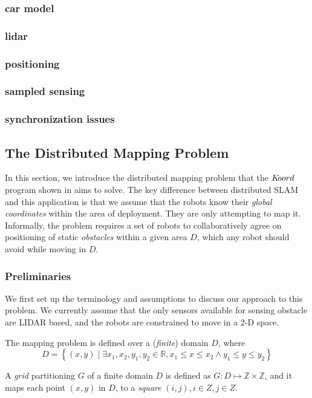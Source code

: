 \subsubsection{car model}
\subsubsection{lidar}
\subsubsection{positioning}
\subsubsection{sampled sensing}
\subsubsection{synchronization issues}
 
\subsection{The Distributed Mapping Problem}
In this section, we introduce the distributed mapping problem that the $K\kern-2pt oord$ program shown in  aims to solve. The key difference between distributed SLAM and this application is that we assume that the robots know their \emph{global coordinates} within the area of deployment. They are only attempting to map it. 
Informally, the problem requires a set of robots to collaboratively agree on positioning of static \emph{obstacles} within a given area $D$, which any robot should avoid while moving in $D$.

\subsubsection{Preliminaries}
We first set up the terminology and assumptions to discuss our approach to this problem. We currently assume that the only sensors available for sensing obstacle are LIDAR based, and the robots are constrained to move in a 2-D space.

The mapping problem is defined over a (\emph{finite}) domain $D$, where $$D  = \left\{ (x,y) \mid \exists  x_1, x_2 ,y_1, y_2 \in \mathbb{R} , x_1 \leq x \leq x_2 \wedge y_1 \leq y \leq y_2 \right\}$$

\begin{definition}
A \emph{grid} partitioning $G$ of a finite domain $D$ is defined as $G:D \mapsto \mathbb{Z}\times\mathbb{Z}$, and it maps each point $(x,y)$ in $D$, to a \emph{square} $(i,j), i \in Z, j\in Z$.
\end{definition}

